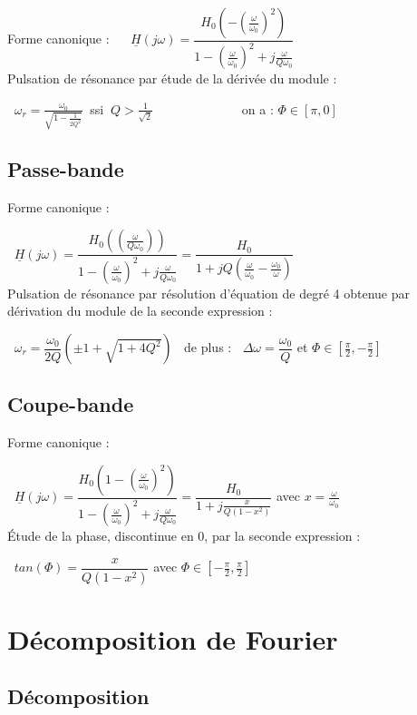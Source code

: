 \documentclass[9pt]{article}
\begin{document}
\begin{multicols*}{2}
Forme canonique :$\>$ $\>$ $\>$ $\underline{H}(j\omega) = \dfrac{H_{0}(-(\frac{\omega}{\omega_{0}})^{2})}{ 1-(\frac{\omega}{\omega_{0}})^{2}+j\frac{\omega}{Q\omega_{0}} }$\\


Pulsation de résonance par étude de la dérivée du module :


$\>$ $\omega_{r} = \frac{\omega_{0}}{\sqrt{1-\frac{1}{2Q^{2}}}} \>$    ssi    $\> Q > \frac{1}{\sqrt{2}}$ $\>$ $\>$ $\>$ $\>$ $\>$ $\>$ $\>$ $\>$ $\>$ $\>$ $\>$ $\>$ 
on a : $\Phi\in[\pi,0]$


\subsection{Passe-bande}

Forme canonique :

$\>$ $\underline{H}(j\omega) = \dfrac{H_{0}((\frac{\omega}{Q\omega_{0}}))}{ 1-(\frac{\omega}{\omega_{0}})^{2}+j\frac{\omega}{Q\omega_{0}} } 
= \dfrac{H_{0}}{1 + jQ(\frac{\omega}{\omega_{0}}-\frac{\omega_{0}}{\omega})} $ \\


Pulsation de résonance par résolution d'équation de degré 4 obtenue par dérivation du module de la seconde expression :


$\>$ $\omega_{r} = \dfrac{\omega_{0}}{2Q}( \pm 1 + \sqrt{1+4Q^{2}} )$  $\>$ de plus : $\>$ $\Delta\omega=\dfrac{\omega_{0}}{Q}$ et $\Phi\in[\frac{\pi}{2},-\frac{\pi}{2}]$

\subsection{Coupe-bande}

Forme canonique :

$\>$ $\underline{H}(j\omega) = \dfrac{H_{0}(1-(\frac{\omega}{\omega_{0}})^{2})}{ 1-(\frac{\omega}{\omega_{0}})^{2}+j\frac{\omega}{Q\omega_{0}} } 
= \dfrac{H_{0}}{1 + j\frac{x}{Q(1-x^{2})}} $ avec 
$ x = \frac{\omega}{\omega_{0}}$ \\


Étude de la phase, discontinue en 0, par la seconde expression :


$\>$ $tan(\Phi)=\dfrac{x}{Q(1-x^{2})}$ avec $\Phi\in[-\frac{\pi}{2},\frac{\pi}{2}]$


\section{Décomposition de Fourier}
\subsection{Décomposition}


\end{multicols*}
\end{document}
